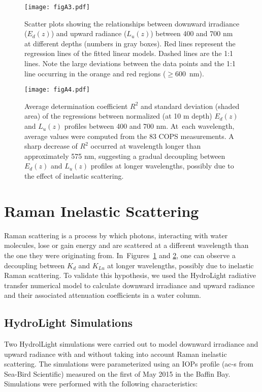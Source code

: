 \documentclass[applsci,article,accept,moreauthors,pdftex,10pt,a4paper]{Definitions/mdpi}
\newcommand{\ked}{\ensuremath{K_{d}}}
\newcommand{\klu}{\ensuremath{K_{Lu}}}
\newcommand{\edz}{\ensuremath{{E_d(z)}}}
\newcommand{\luz}{\ensuremath{{L_u(z)}}}
\begin{document}
\begin{figure}[H]
	\centering
	\texttt{[image: figA3.pdf]}
	\caption{Scatter plots showing the relationships between downward irradiance (\edz{}) and upward radiance (\luz{}) between 400 and 700 nm at different depths (numbers in gray boxes). Red lines represent the regression lines of the fitted linear models. Dashed lines are the 1:1 lines. Note the large deviations between the data points and the 1:1 line occurring in the orange and red regions ($\ge$600~nm).}\label{figA3}
\end{figure}
\unskip
\begin{figure}[H]
	\centering
	\texttt{[image: figA4.pdf]}
	\caption{Average determination coefficient \(R^2\) and standard deviation (shaded area) of the regressions between normalized (at 10 m depth) \edz{} and \luz{} profiles between 400 and 700 nm. At~each wavelength, average values were computed from the 83 COPS measurements. A sharp decrease of \(R^2\) occurred at wavelength longer than approximately 575 nm, suggesting a gradual decoupling between \edz{} and \luz{} profiles at longer wavelengths, possibly due to the effect of inelastic scattering.}\label{figA4}
\end{figure}


\section{Raman Inelastic Scattering}

Raman scattering is %
a process by which photons, interacting with water molecules, lose or gain energy and are scattered at a different wavelength than the one they were originating from. In~Figures~\ref{figA3} and   \ref{figA4}, one can observe a decoupling between \ked{} and \klu{} at longer wavelengths, possibly due to inelastic Raman scattering. To validate this hypothesis, we used the HydroLight radiative transfer numerical model to calculate downward irradiance and upward radiance and their associated attenuation coefficients in a water column.

\subsection*{HydroLight Simulations}

Two HydrolLight simulations were carried out to model downward irradiance and upward radiance with and without taking into account Raman inelastic scattering. The simulations were parameterized using an IOPs profile (ac-s from Sea-Bird Scientific) measured on the first of May 2015 in the Baffin Bay. Simulations were performed with the following characteristics:
\end{document}
